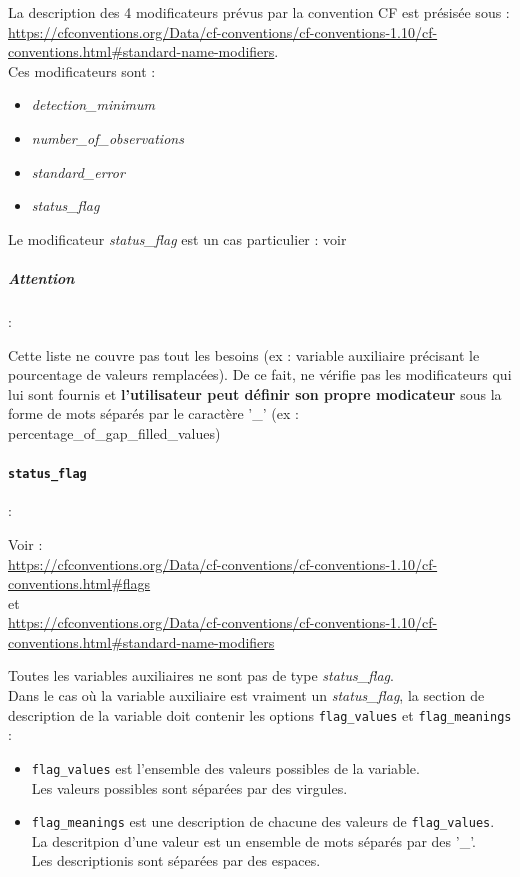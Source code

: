 La description des 4 modificateurs prévus par la convention CF est
présisée sous :\\
\url{https://cfconventions.org/Data/cf-conventions/cf-conventions-1.10/cf-conventions.html\#standard-name-modifiers}.\\
Ces modificateurs sont :

\begin{itemize}
\item
  \textit{detection\_minimum}
\item
  \textit{number\_of\_observations}
\item
  \textit{standard\_error}
\item
  \textit{status\_flag}
\end{itemize}

Le modificateur \textit{status\_flag} est un cas particulier : voir


\subparagraph{Attention} :

Cette liste ne couvre pas tout les besoins (ex :
variable auxiliaire précisant le pourcentage de valeurs remplacées). De ce
fait, \prodcdf ne vérifie pas les modificateurs qui lui sont fournis
et \textbf{l'utilisateur peut définir son propre modicateur} sous la
forme de mots séparés par le caractère '\_' (ex :
percentage\_of\_gap\_filled\_values)


\paragraph{\texttt{status\_flag}} : \label{ref:status_flag}

Voir :\\
\url{https://cfconventions.org/Data/cf-conventions/cf-conventions-1.10/cf-conventions.html\#flags}~\\
et\\
\url{https://cfconventions.org/Data/cf-conventions/cf-conventions-1.10/cf-conventions.html\#standard-name-modifiers}

Toutes les variables auxiliaires ne sont pas de type
\textit{status\_flag}.\\
Dans le cas où la variable auxiliaire est vraiment un
\textit{status\_flag}, la section de description de la variable doit
contenir les options \texttt{flag\_values} et \texttt{flag\_meanings} :

\begin{itemize}
\item
  \texttt{flag\_values} est l'ensemble des valeurs possibles de la
  variable.\\
  Les valeurs possibles sont séparées par des virgules.
\item
  \texttt{flag\_meanings} est une description de chacune des valeurs de
  \texttt{flag\_values}.\\
  La descritpion d'une valeur est un ensemble de mots séparés par des
  '\_'.\\
  Les descriptionis sont séparées par des espaces.
\end{itemize}


